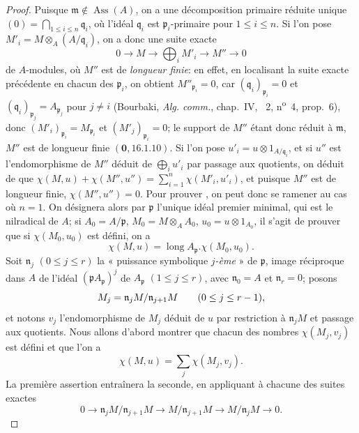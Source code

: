 \begin{proof}
Puisque $\mathfrak{m}\notin\operatorname{Ass}(A)$, on a une décomposition primaire réduite unique $(0)=\bigcap_{1\leq i\leq n}\mathfrak{q}_i$, où l'idéal $\mathfrak{q}_i$ est $\mathfrak{p}_i$-primaire pour $1\leq i\leq n$.
Si l'on pose $M'_i=M\otimes_A(A/\mathfrak{q}_i)$, on a donc une suite exacte
\[
  0\to M\to\bigoplus_iM'_i\to M''\to0
\]
de $A$-modules, où $M''$ est de \emph{longueur finie}:
en effet, en localisant la suite exacte précédente en chacun des $\mathfrak{p}_i$, on obtient $M''_{\mathfrak{p}_i}=0$, car $(\mathfrak{q}_i)_{\mathfrak{p}_i}=0$ et $(\mathfrak{q}_i)_{\mathfrak{p}_j}=A_{\mathfrak{p}_j}$ pour $j\neq i$ (Bourbaki, \emph{Alg. comm.}, chap.~IV, \textsection~2, n\textsuperscript{o}~4, prop.~6), donc $(M'_i)_{\mathfrak{p}_i}=M_{\mathfrak{p}_i}$ et $(M'_j)_{\mathfrak{p}_i}=0$;
le support de $M''$ étant donc réduit à $\mathfrak{m}$, $M''$ est de longueur finie $(\mathbf{0},16.1.10)$.
Si l'on pose $u'_i=u\otimes1_{A/\mathfrak{q}_i}$, et si $u''$ est l'endomorphisme de $M''$ déduit de $\bigoplus_i u'_i$ par passage aux quotients, on déduit de  que $\chi(M,u)+\chi(M'',u'')=\sum_{i=1}^n\chi(M'_i,u'_i)$, et puisque $M''$ est de longueur finie, $\chi(M'',u'')=0$.
Pour prouver , on peut donc se ramener au cas où $n=1$.
On désignera alors par $\mathfrak{p}$ l'unique idéal premier minimal, qui est le nilradical de $A$;
si $A_0=A/\mathfrak{p}$, $M_0=M\otimes_AA_0$, $u_0=u\otimes1_{A_0}$, il s'agit de prouver que si $\chi(M_0,u_0)$ est défini, on a
\[
\label{IV.21.10.17.9}
  \chi(M,u)=\operatorname{long}A_{\mathfrak{p}}.\chi(M_0,u_0).
  \tag{21.10.17.9}
\]
Soit $\mathfrak{n}_j$ $(0\leq j\leq r)$ la « puissance symbolique \emph{$j$-ème} » de $\mathfrak{p}$, image réciproque dans $A$ de l'idéal $(\mathfrak{p}A_{\mathfrak{p}})^j$ de $A_{\mathfrak{p}}$ $(1\leq j\leq r)$, avec $\mathfrak{n}_0=A$ et $\mathfrak{n}_r=0$;
posons
\[
  M_j=\mathfrak{n}_jM/\mathfrak{n}_{j+1}M\qquad(0\leq j\leq r- 1),
\]
et notons $v_j$ l'endomorphisme de $M_j$ déduit de $u$ par restriction à $\mathfrak{n}_jM$ et passage aux quotients.
Nous allons d'abord montrer que chacun des nombres $\chi(M_j,v_j)$ est défini et que l'on a
\[
\label{IV.21.10.17.10}
  \chi(M,u)=\sum_j\chi(M_j,v_j).
  \tag{21.10.17.10}
\]
La première assertion entraînera la seconde, en appliquant  à chacune des suites exactes
\[
  0\to\mathfrak{n}_jM/\mathfrak{n}_{j+1}M\to M/\mathfrak{n}_{j+1}M\to M/\mathfrak{n}_jM\to0.
\]


\end{proof}

